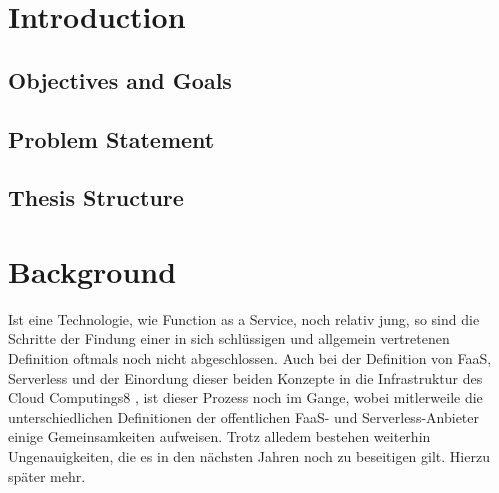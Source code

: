 \documentclass[11pt]{article}
\begin{document}
\section{Introduction}
\subsection{Objectives and Goals}
\subsection{Problem Statement}
\subsection{Thesis Structure}










\section{Background}
Ist eine Technologie, wie Function as a Service, noch relativ jung, so sind die Schritte der Findung einer in sich schlüssigen und allgemein vertretenen Definition oftmals noch nicht abgeschlossen. Auch bei der Definition von FaaS, Serverless und der Einordung dieser beiden Konzepte in die Infrastruktur des Cloud Computings8  \cite{mell2011nist}, ist dieser Prozess noch im Gange, wobei mitlerweile die unterschiedlichen Definitionen der offentlichen FaaS- und Serverless-Anbieter einige Gemeinsamkeiten aufweisen. Trotz alledem bestehen weiterhin Ungenauigkeiten, die es in den nächsten Jahren noch zu beseitigen gilt. Hierzu später mehr.\\\\ 
\end{document}
